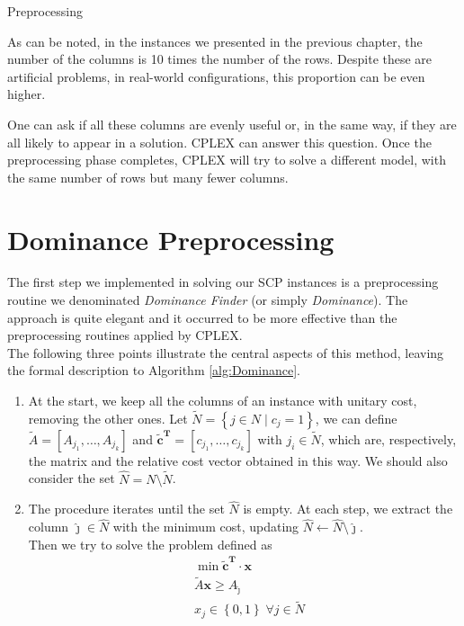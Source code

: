 \documentclass[a4paper,12pt]{mydeitesi_eng}
\begin{document}
\begin{chapter}{Preprocessing}
\label{chp:Preprocessing}

As can be noted, in the instances we presented in the previous chapter, the number of the columns is 10 times the number of the rows.
Despite these are artificial problems, in real-world configurations, this proportion can be even higher.

One can ask if all these columns are evenly useful or, in the same way, if they are all likely to appear in a solution.
CPLEX can answer this question.
Once the preprocessing phase completes, CPLEX will try to solve a different model, with the same number of rows but many fewer columns.

\section{Dominance Preprocessing}
\label{sec:DominancePreprocessing}

The first step we implemented in solving our SCP instances is a preprocessing routine we denominated \emph{Dominance Finder} (or simply \emph{Dominance}). The approach is quite elegant and it occurred to be more effective than the preprocessing routines applied by CPLEX.\\

The following three points illustrate the central aspects of this method, leaving the formal description to Algorithm \ref{alg:Dominance}.
\begin{enumerate}
\item At the start, we keep all the columns of an instance with unitary cost, removing the other ones.
Let $\tilde{N} = \left\{j \in N \mid c_j = 1 \right\}$, we can define $\tilde{A} = [ A_{j_1}, \dots, A_{j_k} ]$ and $\mathbf{\tilde{c}^T} = [ c_{j_1}, \dots, c_{j_k} ]$ with $j_i \in \tilde{N}$, which are, respectively, the matrix and the relative cost vector obtained in this way.
We should also consider the set $\hat{N} = N \setminus \tilde{N}$.

\item The procedure iterates until the set $\hat{N}$ is empty.
At each step, we extract the column $\hat{\jmath} \in \hat{N}$ with the minimum cost, updating $\hat{N} \gets \hat{N} \setminus \hat{\jmath}$.\\
Then we try to solve the problem defined as
\begin{align}
& \min \mathbf{\tilde{c}^T \cdot x} \\
& \tilde{A} \mathbf{x} \ge A_{\hat{\jmath}} \\
& x_j \in \left\{0, 1\right\} \; \forall j \in \tilde{N}
\end{align}


\end{enumerate}
\end{chapter}
\end{document}
